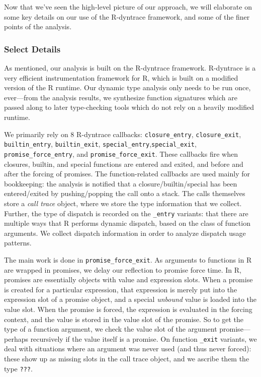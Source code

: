 \documentclass[acmsmall,review,anonymous]{acmart}\settopmatter{printfolios=true,printccs=false,printacmref=false}
\begin{document}
Now that we've seen the high-level picture of our approach, we will elaborate on some key details on our use of the R-dyntrace framework, and some of the finer points of the analysis.

%
%
\subsubsection{Select Details}

As mentioned, our analysis is built on the R-dyntrace framework.
R-dyntrace is a very efficient instrumentation framework for R, which is built on a modified version of the R runtime.
Our dynamic type analysis only needs to be run once, ever---from the analysis results, we synthesize function signatures which are passed along to later type-checking tools which do not rely on a heavily modified runtime. 

We primarily rely on 8 R-dyntrace callbacks: \texttt{closure\_entry}, \texttt{closure\_exit}, \texttt{builtin\_entry}, \texttt{builtin\_exit}, \texttt{special\_entry},\texttt{special\_exit}, \texttt{promise\_force\_entry}, and \texttt{promise\_force\_exit}.
These callbacks fire when closures, builtin, and special functions are entered and exited, and before and after the forcing of promises.
The function-related callbacks are used mainly for bookkeeping: the analysis is notified that a closure/builtin/special has been entered/exited by pushing/popping the call onto a stack.
The calls themselves store a {\it call trace} object, where we store the type information that we collect.
Further, the type of dispatch is recorded on the {\tt \_entry} variants:  that there are multiple ways that R performs dynamic dispatch, based on the class of function arguments.
We collect dispatch information in order to analyze dispatch usage patterns.

The main work is done in {\tt promise\_force\_exit}.
As arguments to functions in R are wrapped in promises, we delay our reflection to promise force time.
In R, promises are essentially objects with value and expression slots.
When a promise is created for a particular expression, that expression is merely put into the expression slot of a promise object, and a special {\it unbound} value is loaded into the value slot.
When the promise is forced, the expression is evaluated in the forcing context, and the value is stored in the value slot of the promise.
So to get the type of a function argument, we check the value slot of the argument promise---perhaps recursively if the value itself is a promise.
On function {\tt \_exit} variants, we deal with situations where an argument was never used (and thus never forced): these show up as missing slots in the call trace object, and we ascribe them the type {\tt ???}.
\end{document}
